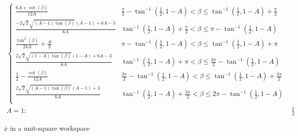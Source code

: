 \documentclass[conference]{IEEEtran}
\begin{document}
\begin{table*}
\begin{align}
\begin{cases}
 \frac{6 A+\cot (\beta )}{12 A} & \frac{\pi }{2}-\tan ^{-1}\left(\frac{1}{2},1-A\right)<\beta \leq \tan ^{-1}\left(\frac{1}{2},1-A\right)+\frac{\pi }{2} \\
 \frac{-2 \sqrt{2} \sqrt{(A-1) \tan (\beta )} (A-1)+6 A-3}{6 A} & \tan ^{-1}\left(\frac{1}{2},1-A\right)+\frac{\pi }{2}<\beta \leq \pi -\tan ^{-1}\left(\frac{1}{2},1-A\right) \\
 \frac{\tan ^2(\beta )}{24 A}+\frac{A}{2} & \pi -\tan ^{-1}\left(\frac{1}{2},1-A\right)<\beta \leq \tan ^{-1}\left(\frac{1}{2},1-A\right)+\pi  \\
 \frac{2 \sqrt{2} \sqrt{(1-A) \tan (\beta )} (1-A)+6 A-3}{6 A} & \tan ^{-1}\left(\frac{1}{2},1-A\right)+\pi <\beta \leq \frac{3 \pi }{2}-\tan ^{-1}\left(\frac{1}{2},1-A\right) \\
 \frac{1}{2}-\frac{\cot (\beta )}{12 A} & \frac{3 \pi }{2}-\tan ^{-1}\left(\frac{1}{2},1-A\right)<\beta \leq \tan ^{-1}\left(\frac{1}{2},1-A\right)+\frac{3 \pi }{2} \\
 \frac{2 \sqrt{2} \sqrt{(A-1) \tan (\beta )} (A-1)+3}{6 A} & \tan ^{-1}\left(\frac{1}{2},1-A\right)+\frac{3 \pi }{2}<\beta \leq 2 \pi -\tan ^{-1}\left(\frac{1}{2},1-A\right) \\
\end{cases}
 \nonumber \\
A=1: &\frac{1}{2}
\end{align}
\protect\caption{$\bar{x}$ in a unit-square workspace}
\label{tab:SquareXMean}
\end{table*}
\end{document}
